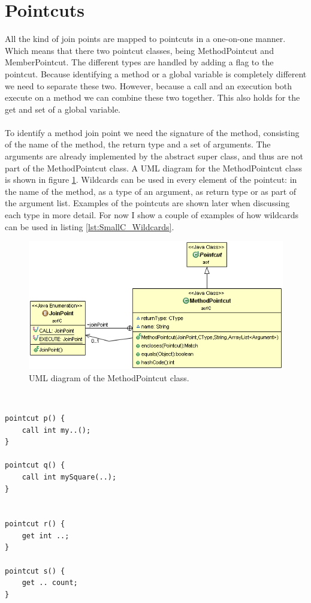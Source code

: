 \documentclass[a4paper]{report}
\begin{document}
\section{Pointcuts}
All the kind of join points are mapped to pointcuts in a one-on-one manner. Which means that there two pointcut classes, being MethodPointcut and MemberPointcut. The different types are handled by adding a flag to the pointcut. Because identifying a method or a global variable is completely different we need to separate these two. However, because a call and an execution both execute on a method we can combine these two together. This also holds for the get and set of a global variable.\\
\\
To identify a method join point we need the signature of the method, consisting of the name of the method, the return type and a set of arguments. The arguments are already implemented by the abstract super class, and thus are not part of the MethodPointcut class. A UML diagram for the MethodPointcut class is shown in figure \ref{fig:MethodPointcut}. Wildcards can be used in every element of the pointcut: in the name of the method, as a type of an argument, as  return type or as part of the argument list. Examples of the pointcuts are shown later when discussing each type in more detail. For now I show a couple of examples of how wildcards can be used in listing \ref{lst:SmallC_Wildcards}.\\
\begin{figure}[h!]
\centering
\includegraphics[scale=0.7]{images/AOFC/MethodPointcut.png}
\caption{UML diagram of the MethodPointcut class.}
\label{fig:MethodPointcut}
\end{figure}
\\
\begin{lstlisting}[multicols=2,caption=Some examples of wildcards.,label=lst:SmallC_Wildcards]
pointcut p() {
	call int my..();
}

pointcut q() {
	call int mySquare(..);
}


pointcut r() {
	get int ..;
}

pointcut s() {
	get .. count;
}
\end{lstlisting}
\end{document}
